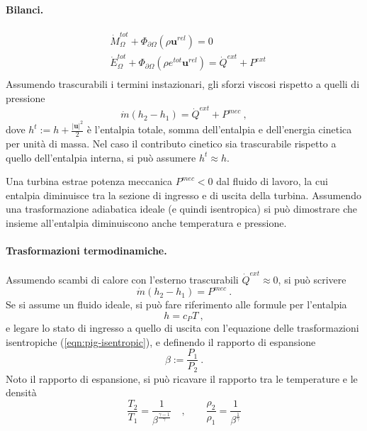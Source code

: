 \paragraph{Bilanci.}
    \begin{equation}
    \begin{aligned}
        & \dot{M}_{\Omega}^{tot} + \Phi_{\partial \Omega}(\rho \mathbf{u}^{rel}) = 0 \\
        & \dot{E}_{\Omega}^{tot} + \Phi_{\partial \Omega}(\rho e^{tot} \mathbf{u}^{rel}) = \dot{Q}^{ext} + P^{ext} \\
    \end{aligned}
    \end{equation}
    Assumendo trascurabili i termini instazionari, gli sforzi viscosi rispetto a quelli di pressione
    \begin{equation}
        \dot{m} \left( h_2 - h_1 \right) = \dot{Q}^{ext} + P^{mec} \ ,
    \end{equation}
dove $h^t := h + \frac{|\mathbf{u}|^2}{2}$ è l'entalpia totale, somma dell'entalpia e dell'energia cinetica per unità di massa. Nel caso il contributo cinetico sia trascurabile rispetto a quello dell'entalpia interna, si può assumere $h^t \approx h$. 

\noindent
Una turbina estrae potenza meccanica $P^{mec} < 0$ dal fluido di lavoro, la cui entalpia diminuisce tra la sezione di ingresso e di uscita della turbina. Assumendo una trasformazione adiabatica ideale (e quindi isentropica) si può dimostrare che insieme all'entalpia diminuiscono anche temperatura e pressione.
\paragraph{Trasformazioni termodinamiche.} Assumendo scambi di calore con l'esterno trascurabili $\dot{Q}^{ext} \approx 0$, si può scrivere 
    \begin{equation}
        \dot{m} \left( h_2 - h_1 \right) = P^{mec} \ .
    \end{equation}
Se si assume un fluido ideale, si può fare riferimento alle formule per l'entalpia
\begin{equation}
    h = c_P T \ ,
\end{equation}
e legare lo stato di ingresso a quello di uscita con l'equazione delle trasformazioni isentropiche (\ref{eqn:pig-isentropic}), e definendo il rapporto di espansione
\begin{equation}
    \beta := \dfrac{P_1}{P_2} \ .
\end{equation}
Noto il rapporto di espansione, si può ricavare il rapporto tra le temperature e le densità
\begin{equation}
    \dfrac{T_2}{T_1} = \dfrac{1}{\beta^{\frac{\gamma-1}{\gamma}}}  \quad , \qquad 
    \dfrac{\rho_2}{\rho_1} = \dfrac{1}{\beta^{\frac{1}{\gamma}}}
\end{equation}


